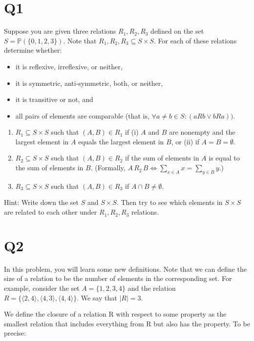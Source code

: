 \documentclass[12pt]{exam}
\begin{document}
\section{Q1}
Suppose you are given three relations $R_1, R_2, R_3$ defined on the set $S = \mathbb{P}(\{0,1,2,3\})$. Note that $R_1,R_2,R_3 \subseteq S \times S$. For each of these relations determine whether:

\begin{itemize}
    \item it is reflexive, irreflexive, or neither,
    \item it is symmetric, anti-symmetric, both, or neither,
    \item it is transitive or not, and
    \item all pairs of elements are comparable (that is, $\forall a \neq b \in S : (aRb \vee bRa))$.
\end{itemize}

\begin{enumerate}
    \item $R_1 \subseteq S \times S$ such that $(A, B) \in R_1$ if (i) $A$ and $B$ are nonempty and the largest element in $A$ equals the largest element in $B$, or (ii) if $A = B = \emptyset$.

    \item $R_2 \subseteq S \times S$ such that $(A, B) \in R_2$ if the sum of elements in $A$ is equal to the sum of elements in $B$. (Formally, $A\, R_2\,B \iff \sum_{x \in A} x =  \sum_{y \in B} y.$)

    \item $R_3 \subseteq S \times S$ such that $(A,B) \in R_3$ if $A \cap B \neq \emptyset$.
\end{enumerate}

Hint: Write down the set $S$ and $S\times S$. Then try to see which elements in $S \times S$ are related to each other under $R_1, R_2, R_3$ relations.

\section{Q2} 

In this problem, you will learn some new definitions. Note that we can define the size of a relation to be the number of elements in the corresponding set. For example, consider the set $A = \{1, 2, 3, 4\}$ and the relation $R = \{\langle 2, 4\rangle, \langle4, 3\rangle, \langle4, 4\rangle\}$. We say that $|R| = 3$.

We define the closure of a relation R with respect to some property as the smallest relation that includes everything from R but also has the property. To be precise:
\end{document}
